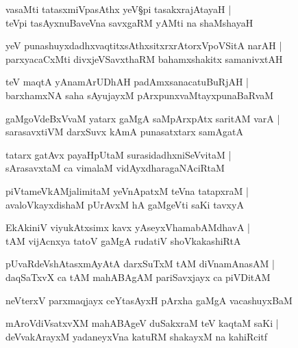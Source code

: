 \begin{shloka}
vasaMti tatasxmiVpasAthx yeV\S pi tasakxrajAtayaH |\\
teVpi tasAyxnuBaveVna savxgaRM yAMti na shaMshayaH
\end{shloka}

\begin{shloka}
yeV punashuyxdadhxvaqtitxsAthxsitxrxrAtorxVpoVSitA narAH |\\
parxyacaCxMti divxjeVSavxthaRM bahamxshakitx samanivxtAH 
\end{shloka}

\begin{shloka}
teV maqtA yAnamArUDhAH padAmxsanacatuBuRjAH |\\
barxhamxNA saha sAyujayxM pArxpunxvaMtayxpunaBaRvaM
\end{shloka}

\begin{shloka}
gaMgoVdeBxVvaM yatarx gaMgA saMpArxpAtx saritAM varA |\\
sarasavxtiVM darxSuvx kAmA punasatxtarx samAgatA
\end{shloka}

\begin{shloka}
tatarx gatAvx payaHpUtaM surasidadhxniSeVvitaM |\\
sArasavxtaM ca vimalaM vidAyxdharagaNAciRtaM
\end{shloka}

\begin{shloka}
piVtameVkAMjalimitaM yeVnApatxM teVna tatapxraM |\\ avaloVkayxdishaM pUrAvxM hA gaMgeVti saKi tavxyA
\end{shloka}

\begin{shloka}
EkAkiniV viyukAtxsimx kavx yAseyxVhamabAMdhavA |\\
tAM vijAcnxya tatoV gaMgA rudatiV shoVkakashiRtA
\end{shloka}

\begin{shloka}
pUvaRdeVshAtasxmAyAtA darxSuTxM tAM diVnamAnasAM |\\
daqSaTxvX ca tAM mahABAgAM pariSavxjayx ca piVDitAM
\end{shloka}

\begin{shloka}
neVterxV parxmaqjayx ceYtasAyxH pArxha gaMgA vacashuyxBaM
\end{shloka}

\begin{shloka}
mAroVdiVsatxvXM mahABAgeV duSakxraM teV kaqtaM saKi |\\
deVvakArayxM yadaneyxVna katuRM shakayxM na kahiRcitf
\end{shloka}

